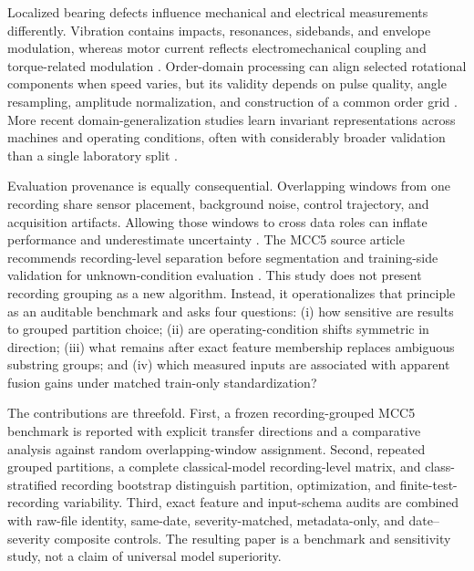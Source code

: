 \documentclass[11pt]{article}
\begin{document}
Localized bearing defects influence mechanical and electrical measurements differently. Vibration contains impacts, resonances, sidebands, and envelope modulation, whereas motor current reflects electromechanical coupling and torque-related modulation \cite{Gundewar2020InductionMotorReview,Toma2020MotorCurrentGA,Hoang2019MotorCurrentFusion,Guan2023MotorCurrentCausalConv}. Order-domain processing can align selected rotational components when speed varies, but its validity depends on pulse quality, angle resampling, amplitude normalization, and construction of a common order grid \cite{Lu2019TacholessReview,Jiang2023TacholessOrder,Duan2021AdaptiveTacholess,Ji2021OrderTracking1DCNN}. More recent domain-generalization studies learn invariant representations across machines and operating conditions, often with considerably broader validation than a single laboratory split \cite{Zhu2024DIRNet,Huang2025DPJDG}.

Evaluation provenance is equally consequential. Overlapping windows from one recording share sensor placement, background noise, control trajectory, and acquisition artifacts. Allowing those windows to cross data roles can inflate performance and underestimate uncertainty \cite{Kapoor2023Leakage,Hendriks2021CWRUBenchmark,Ragab2023AdaTime,Vieira2024ConnectomeLeakage,Wen2021MRILLeakage}. The MCC5 source article recommends recording-level separation before segmentation and training-side validation for unknown-condition evaluation \cite{Chen2026MCC5DataBrief,Chen2025MCC5Mendeley}. This study does not present recording grouping as a new algorithm. Instead, it operationalizes that principle as an auditable benchmark and asks four questions: (i) how sensitive are results to grouped partition choice; (ii) are operating-condition shifts symmetric in direction; (iii) what remains after exact feature membership replaces ambiguous substring groups; and (iv) which measured inputs are associated with apparent fusion gains under matched train-only standardization?

The contributions are threefold. First, a frozen recording-grouped MCC5 benchmark is reported with explicit transfer directions and a comparative analysis against random overlapping-window assignment. Second, repeated grouped partitions, a complete classical-model recording-level matrix, and class-stratified recording bootstrap distinguish partition, optimization, and finite-test-recording variability. Third, exact feature and input-schema audits are combined with raw-file identity, same-date, severity-matched, metadata-only, and date--severity composite controls. The resulting paper is a benchmark and sensitivity study, not a claim of universal model superiority.
\end{document}
